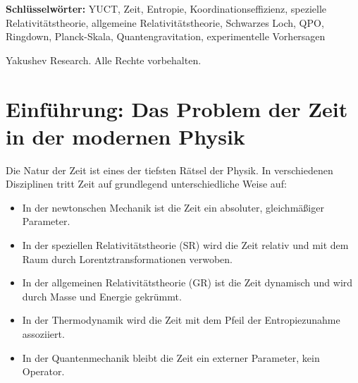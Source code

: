\documentclass[12pt,a4paper]{article}
\begin{document}
\begin{titlepage}
\begin{center}
\begin{minipage}{0.9\textwidth}
\begin{abstract}
					Wir erweitern den Rahmen auf Schwarze Löcher und zeigen, dass die Skalierung von Zeitfluktuationen mit der Masse dem universellen Exponenten \(\beta = 0.67\) folgt. Die relative Unsicherheit der Zeitrate skaliert als \(\delta\tau/\tau \propto M^{-0.67}\), was zu konkreten, überprüfbaren Vorhersagen führt: (i) die Breite quasiperiodischer Oszillationen (QPOs) in Akkretionsscheiben Schwarzer Löcher sollte mit der Masse als \(\Delta\nu/\nu \propto M^{-0.67}\) skalieren; (ii) die Streuung der Ringdown-Frequenzen verschmelzender Schwarzer Löcher sollte mit der Masse nach demselben Gesetz abnehmen. Diese Vorhersagen können mit bestehenden Röntgendaten (RXTE, NuSTAR) und Gravitationswellenbeobachtungen (LIGO/Virgo, künftiges Einstein-Teleskop) getestet werden. Der Rahmen vereinheitlicht die relativistischen, gravitativen und thermodynamischen Aspekte der Zeit und liefert ein kohärentes Bild, das mit dem universellen Skalierungsgesetz \(\beta = 0.67\) (Anhang L) und der Evolutionsdynamik komplexer Systeme (Anhang T) konsistent ist.
				\end{abstract}
			\end{minipage}
			
			\vspace{1cm}
			
			\noindent
			\small\textbf{Schlüsselwörter:} YUCT, Zeit, Entropie, Koordinationseffizienz, spezielle Relativitätstheorie, allgemeine Relativitätstheorie, Schwarzes Loch, QPO, Ringdown, Planck-Skala, Quantengravitation, experimentelle Vorhersagen
			
			\vspace{0.5cm}
			
			\noindent
			 Yakushev Research. Alle Rechte vorbehalten.
		\end{center}
	\end{titlepage}
	
	\tableofcontents
	\newpage
	
	\section{Einführung: Das Problem der Zeit in der modernen Physik}
	\label{sec:intro}
	
	Die Natur der Zeit ist eines der tiefsten Rätsel der Physik. In verschiedenen Disziplinen tritt Zeit auf grundlegend unterschiedliche Weise auf:
	\begin{itemize}
		\item In der newtonschen Mechanik ist die Zeit ein absoluter, gleichmäßiger Parameter.
		\item In der speziellen Relativitätstheorie (SR) wird die Zeit relativ und mit dem Raum durch Lorentztransformationen verwoben.
		\item In der allgemeinen Relativitätstheorie (GR) ist die Zeit dynamisch und wird durch Masse und Energie gekrümmt.
		\item In der Thermodynamik wird die Zeit mit dem Pfeil der Entropiezunahme assoziiert.
		\item In der Quantenmechanik bleibt die Zeit ein externer Parameter, kein Operator.
	\end{itemize}
	
\end{document}
